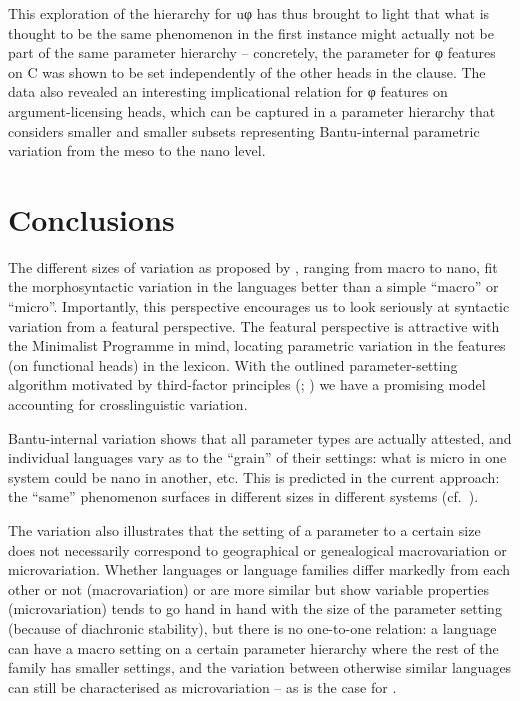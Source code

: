 \documentclass[output=paper]{langsci/langscibook}
\begin{document}
This exploration of the hierarchy for uφ  has thus brought to
light that what is thought to be the same phenomenon in the first instance
might actually not be part of the same parameter hierarchy -- concretely, the parameter for φ features on C was shown to be
set independently of the other heads in the clause. The data also revealed an
interesting implicational relation for φ features on argument-licensing heads,
which can be captured in a parameter hierarchy that
considers smaller and smaller subsets representing Bantu-internal
parametric variation from the meso to the nano level.

\section{Conclusions}\label{sec:3.4}

The different sizes of variation as proposed by \citet{BibRob2015}, ranging
from macro to nano, fit the morphosyntactic variation in the  languages
better than a simple \enquote{macro} or \enquote{micro}. Importantly, this perspective
encourages us to look seriously at syntactic variation from a featural
perspective. The featural perspective is attractive with the Minimalist
Programme in mind, locating parametric variation in the features (on functional
heads) in the lexicon. With the outlined parameter-setting algorithm motivated
by third-factor principles (\citealt{Biberauer2017,Biberauer2017c};
\citealt{BibRob2017}) we have a promising model accounting for
crosslinguistic variation.

Bantu-internal variation shows that all parameter types are actually attested,
and individual languages vary as to the “grain” of their settings: what is
micro in one system could be nano in another, etc. This is predicted in the
current approach: the “same” phenomenon surfaces in different sizes in
different systems (cf.\ \citealt{BibRob2016,Ledgeway2013}).

The  variation also illustrates that the setting of a parameter to a
certain size does not necessarily correspond to geographical or genealogical
macrovariation or microvariation. Whether languages or language families differ
markedly from each other or not (macrovariation) or are more similar but show
variable properties (microvariation) tends to go hand in hand with the size of
the parameter setting (because of diachronic stability), but there is no
one-to-one relation: a language can have a macro setting on a certain parameter
hierarchy where the rest of the family has smaller settings, and the variation
between otherwise similar languages can still be characterised as
microvariation – as is the case for .
\end{document}
